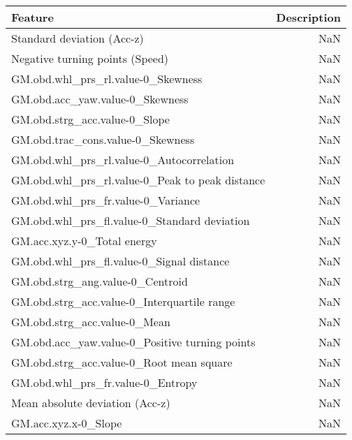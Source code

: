 \begin{table}
\centering
\label{table:reg_fs}
\begin{tabular}{lr}
\toprule
                               \textbf{Feature} & \textbf{Description} \\
\midrule
                     Standard deviation (Acc-z) &                  NaN \\
                Negative turning points (Speed) &                  NaN \\
             GM.obd.whl_prs_rl.value-0_Skewness &                  NaN \\
                GM.obd.acc_yaw.value-0_Skewness &                  NaN \\
                  GM.obd.strg_acc.value-0_Slope &                  NaN \\
              GM.obd.trac_cons.value-0_Skewness &                  NaN \\
      GM.obd.whl_prs_rl.value-0_Autocorrelation &                  NaN \\
GM.obd.whl_prs_rl.value-0_Peak to peak distance &                  NaN \\
             GM.obd.whl_prs_fr.value-0_Variance &                  NaN \\
   GM.obd.whl_prs_fl.value-0_Standard deviation &                  NaN \\
                    GM.acc.xyz.y-0_Total energy &                  NaN \\
      GM.obd.whl_prs_fl.value-0_Signal distance &                  NaN \\
               GM.obd.strg_ang.value-0_Centroid &                  NaN \\
    GM.obd.strg_acc.value-0_Interquartile range &                  NaN \\
                   GM.obd.strg_acc.value-0_Mean &                  NaN \\
 GM.obd.acc_yaw.value-0_Positive turning points &                  NaN \\
       GM.obd.strg_acc.value-0_Root mean square &                  NaN \\
              GM.obd.whl_prs_fr.value-0_Entropy &                  NaN \\
                Mean absolute deviation (Acc-z) &                  NaN \\
                           GM.acc.xyz.x-0_Slope &                  NaN \\
\bottomrule
\end{tabular}
\end{table}
